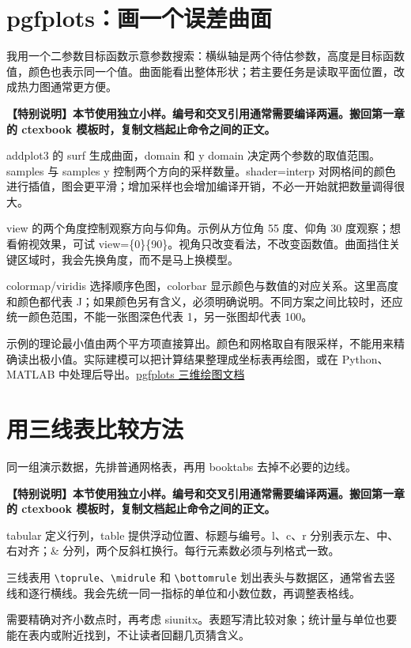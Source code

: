 \section{pgfplots：画一个误差曲面}

我用一个二参数目标函数示意参数搜索：横纵轴是两个待估参数，高度是目标函数值，颜色也表示同一个值。曲面能看出整体形状；若主要任务是读取平面位置，改成热力图通常更方便。

\begin{tcolorbox}[colback=Teal!4,colframe=Teal,boxrule=.7pt,arc=1mm,fontupper=\small\bfseries]\textbf{【特别说明】本节使用独立小样。编号和交叉引用通常需要编译两遍。搬回第一章的 ctexbook 模板时，复制文档起止命令之间的正文。}\end{tcolorbox}


addplot3 的 surf 生成曲面，domain 和 y domain 决定两个参数的取值范围。samples 与 samples y 控制两个方向的采样数量。shader=interp 对网格间的颜色进行插值，图会更平滑；增加采样也会增加编译开销，不必一开始就把数量调得很大。

view 的两个角度控制观察方向与仰角。示例从方位角 55 度、仰角 30 度观察；想看俯视效果，可试 view=\{0\}\{90\}。视角只改变看法，不改变函数值。曲面挡住关键区域时，我会先换角度，而不是马上换模型。

colormap/viridis 选择顺序色图，colorbar 显示颜色与数值的对应关系。这里高度和颜色都代表 J；如果颜色另有含义，必须明确说明。不同方案之间比较时，还应统一颜色范围，不能一张图深色代表 1，另一张图却代表 100。

示例的理论最小值由两个平方项直接算出。颜色和网格取自有限采样，不能用来精确读出极小值。实际建模可以把计算结果整理成坐标表再绘图，或在 Python、MATLAB 中处理后导出。\href{https://tikz.dev/pgfplots/reference-3dplots}{pgfplots 三维绘图文档}

\section{用三线表比较方法}

同一组演示数据，先排普通网格表，再用 booktabs 去掉不必要的边线。

\begin{tcolorbox}[colback=Teal!4,colframe=Teal,boxrule=.7pt,arc=1mm,fontupper=\small\bfseries]\textbf{【特别说明】本节使用独立小样。编号和交叉引用通常需要编译两遍。搬回第一章的 ctexbook 模板时，复制文档起止命令之间的正文。}\end{tcolorbox}


tabular 定义行列，table 提供浮动位置、标题与编号。l、c、r 分别表示左、中、右对齐；\& 分列，两个反斜杠换行。每行元素数必须与列格式一致。

三线表用 \verb|\toprule|、\verb|\midrule| 和 \verb|\bottomrule| 划出表头与数据区，通常省去竖线和逐行横线。我会先统一同一指标的单位和小数位数，再调整表格线。

需要精确对齐小数点时，再考虑 siunitx。表题写清比较对象；统计量与单位也要能在表内或附近找到，不让读者回翻几页猜含义。
